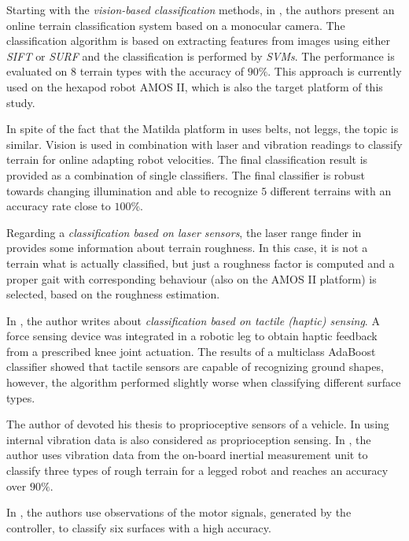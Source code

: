 Starting with the \textit{vision-based classification} methods, in \citep{article:01:visual}, the authors present an online terrain classification system based on a monocular camera. The classification algorithm is based on extracting features from images using either \textit{SIFT} \citep{article:sift} or \textit{SURF} \citep{article:surf} and the classification is performed by \textit{SVMs}. The performance is evaluated on $ 8 $ terrain types with the accuracy of $ 90\% $. This approach is currently used on the hexapod robot AMOS II, which is also the target platform of this study.

In spite of the fact that the Matilda platform in \citep{article:04:onlinelearning} uses belts, not leggs, the topic is similar. Vision is used in combination with laser and vibration readings to classify terrain for online adapting robot velocities. The final classification result is provided as a combination of single classifiers. The final classifier is robust towards changing illumination and able to recognize $ 5 $ different terrains with an accuracy rate close to $ 100\% $.

Regarding a \textit{classification based on laser sensors}, the laser range finder in \citep{article:02:laser} provides some information about terrain roughness. In this case, it is not a terrain what is actually classified, but just a roughness factor is computed and a proper gait with corresponding behaviour (also on the AMOS II platform) is selected, based on the roughness estimation.

In \citep{article:06:haptic}, the author writes about \textit{classification based on tactile (haptic) sensing}. A force sensing device was integrated in a robotic leg to obtain haptic feedback from a prescribed knee joint actuation. The results of a multiclass AdaBoost classifier showed that tactile sensors are capable of recognizing ground shapes, however, the algorithm performed slightly worse when classifying different surface types.

The author of \citep{thesis:05:proprioception} devoted his thesis to proprioceptive sensors of a vehicle. In \citep{article:08:rhex} using internal vibration data is also considered as proprioception sensing. In \citep{article:09:roughterrain}, the author uses vibration data from the on-board inertial measurement unit to classify three types of rough terrain for a legged robot and reaches an accuracy over $ 90\% $.

In \citep{article:03:motorsignals}, the authors use observations of the motor signals, generated by the controller, to classify six surfaces with a high accuracy.

